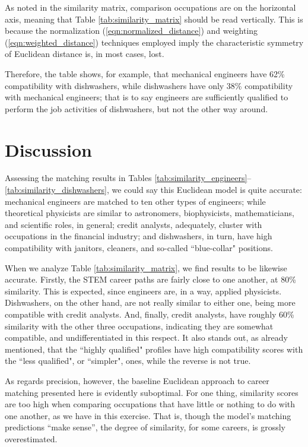 \documentclass{article}
\begin{document}
As noted in the similarity matrix, comparison occupations are on the horizontal
axis, meaning that Table \ref{tab:similarity_matrix} should be read vertically.
This is because the normalization (\ref{eqn:normalized_distance}) and weighting
(\ref{eqn:weighted_distance}) techniques employed imply the characteristic
symmetry of Euclidean distance is, in most cases, lost.

Therefore, the table shows, for example, that mechanical engineers have 62\%
compatibility with dishwashers, while dishwashers have only 38\% compatibility
with mechanical engineers; that is to say engineers are sufficiently qualified
to perform the job activities of dishwashers, but not the other way around.

\section{Discussion}
Assessing the matching results in Tables
\ref{tab:similarity_engineers}--\ref{tab:similarity_dishwashers}, we could say
this Euclidean model is quite accurate: mechanical engineers are matched to ten
other types of engineers; while theoretical physicists are similar to
astronomers, biophysicists, mathematicians, and scientific roles, in general;
credit analysts, adequately, cluster with occupations in the financial
industry; and dishwashers, in turn, have high compatibility with janitors,
cleaners, and so-called ``blue-collar" positions.

When we analyze Table \ref{tab:similarity_matrix}, we find results to be
likewise accurate. Firstly, the STEM career paths are fairly close to one
another, at 80\% similarity. This is expected, since engineers are, in a way,
applied physicists. Dishwashers, on the other hand, are not really similar to
either one, being more compatible with credit analysts. And, finally, credit
analysts, have roughly 60\% similarity with the other three occupations,
indicating they are somewhat compatible, and undifferentiated in this respect.
It also stands out, as already mentioned, that the ``highly qualified" profiles
have high compatibility scores with the ``less qualified", or ``simpler", ones,
while the reverse is not true.

As regards precision, however, the baseline Euclidean approach to career
matching presented here is evidently suboptimal. For one thing, similarity
scores are too high when comparing occupations that have little or nothing to
do with one another, as we have in this exercise. That is, though the model's
matching predictions ``make sense'', the degree of similarity, for some
careers, is grossly overestimated.
\end{document}
